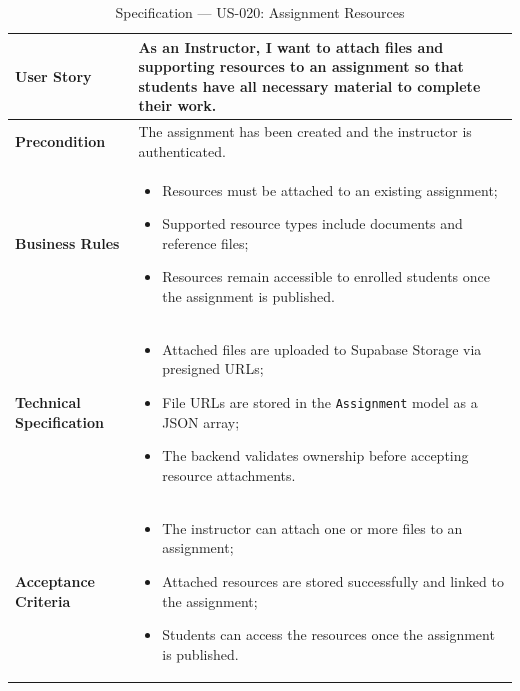\begin{table}[H]
\centering
\caption{Specification — US-020: Assignment Resources}
\label{tab:us020}
\renewcommand{\arraystretch}{1.2}
\begin{tabularx}{\textwidth}{|p{3.5cm}|X|}
\hline
\textbf{User Story} & As an Instructor, I want to attach files and supporting resources to an assignment so that students have all necessary material to complete their work. \\
\hline
\textbf{Precondition} & The assignment has been created and the instructor is authenticated. \\
\hline
\textbf{Business Rules} &
\begin{itemize}[noitemsep, topsep=2pt]
  \item Resources must be attached to an existing assignment;
  \item Supported resource types include documents and reference files;
  \item Resources remain accessible to enrolled students once the assignment is published.
\end{itemize} \\
\hline
\textbf{Technical Specification} &
\begin{itemize}[noitemsep, topsep=2pt]
  \item Attached files are uploaded to Supabase Storage via presigned URLs;
  \item File URLs are stored in the \texttt{Assignment} model as a JSON array;
  \item The backend validates ownership before accepting resource attachments.
\end{itemize} \\
\hline
\textbf{Acceptance Criteria} &
\begin{itemize}[noitemsep, topsep=2pt]
  \item The instructor can attach one or more files to an assignment;
  \item Attached resources are stored successfully and linked to the assignment;
  \item Students can access the resources once the assignment is published.
\end{itemize} \\
\hline
\end{tabularx}
\end{table}

